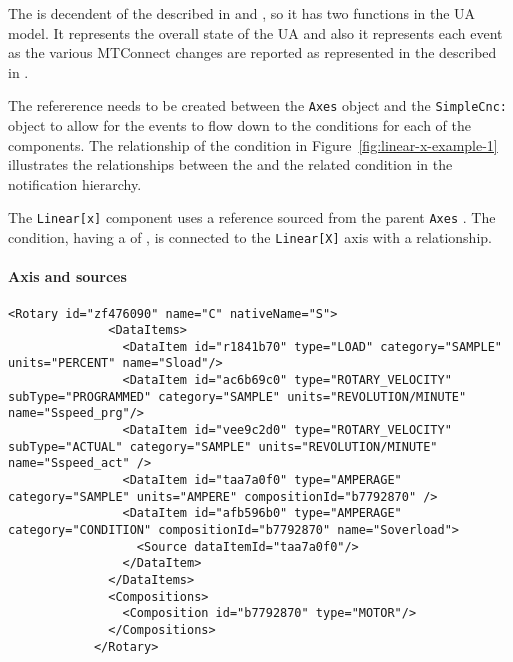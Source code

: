 The  is decendent of the  described in \cite{UAPart5} and \cite{UAPart9}, so it has two functions in the UA model. It represents the overall state of the UA  and also it represents each event as the various MTConnect  changes are reported as represented in the  described in \cite{MTCPart3}.



The  refererence needs to be created between the \texttt{Axes} object and the \texttt{SimpleCnc:} object to allow for the events to flow down to the conditions for each of the components. The relationship of the condition in Figure~\ref{fig:linear-x-example-1} illustrates the relationships between the  and the related condition in the notification hierarchy.

 The \texttt{Linear[x]} component uses a  reference sourced from the parent \texttt{Axes} . The condition, having a  of , is connected to the \texttt{Linear[X]} axis with a  relationship. 

\FloatBarrier

\paragraph{ Axis and  sources}

\begin{lstlisting}[firstnumber=last,%
    caption={Rotary C Axis},label={lst:rotary-axis-example-1}]
            <Rotary id="zf476090" name="C" nativeName="S">
              <DataItems>
                <DataItem id="r1841b70" type="LOAD" category="SAMPLE" units="PERCENT" name="Sload"/>
                <DataItem id="ac6b69c0" type="ROTARY_VELOCITY" subType="PROGRAMMED" category="SAMPLE" units="REVOLUTION/MINUTE" name="Sspeed_prg"/>
                <DataItem id="vee9c2d0" type="ROTARY_VELOCITY" subType="ACTUAL" category="SAMPLE" units="REVOLUTION/MINUTE" name="Sspeed_act" />
                <DataItem id="taa7a0f0" type="AMPERAGE" category="SAMPLE" units="AMPERE" compositionId="b7792870" />
                <DataItem id="afb596b0" type="AMPERAGE" category="CONDITION" compositionId="b7792870" name="Soverload">
                  <Source dataItemId="taa7a0f0"/>
                </DataItem>
              </DataItems>
              <Compositions>
                <Composition id="b7792870" type="MOTOR"/>
              </Compositions>
            </Rotary>
\end{lstlisting}

